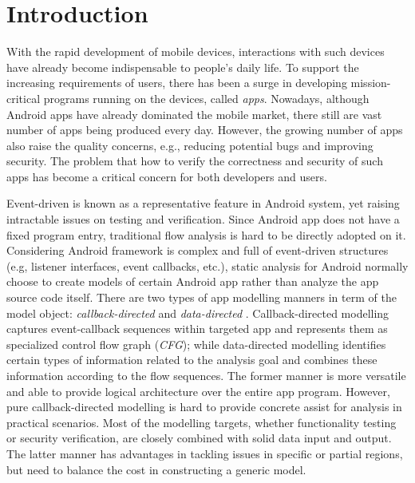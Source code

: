 \section{Introduction}
With the rapid development of mobile devices, interactions with such devices have already become indispensable to people's daily life. To support the increasing requirements of users, there has been a surge in developing mission-critical programs  running on the devices, called \textit{apps}. Nowadays, although Android apps have already dominated the mobile market, there still are vast number of apps being produced every day. However, the growing number of apps also raise the quality concerns, e.g., reducing potential bugs and improving security. The problem that how to verify the correctness and security of such apps has become a critical concern for both developers and users.

Event-driven is known as a representative feature in Android system, yet raising intractable issues on testing and verification. Since Android app does not have a fixed program entry, traditional flow analysis \cite{new1976program, new1978dataflow} is hard to be directly adopted on it. Considering Android framework is complex and full of event-driven structures (e.g, listener interfaces, event callbacks, etc.), static analysis for Android normally choose to create models of certain Android app rather than analyze the app source code itself. There are two types of app modelling manners in term of the model object: \textit{callback-directed} \cite{new2013contextual,new2015static} and \textit{data-directed} \cite{new2014flowdroid, new2015DroidSafe}. Callback-directed modelling captures event-callback sequences within targeted app and represents them as specialized control flow graph (\textit{CFG}); while data-directed modelling identifies certain types of information related to the analysis goal and combines these information according to the flow sequences. The former manner is more versatile and able to provide logical architecture over the entire app program. However, pure callback-directed modelling is hard to provide concrete assist for analysis in practical scenarios. Most of the modelling targets, whether functionality testing or security verification, are closely combined with solid data input and output.
The latter manner has advantages in tackling issues in specific or partial regions, but need to balance the cost in constructing a generic model. 

